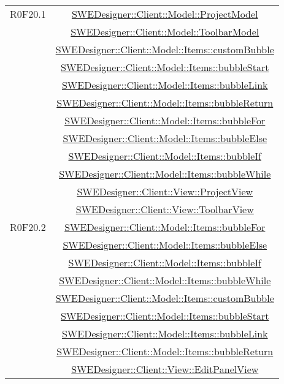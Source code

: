 \documentclass[../DefinizioneDiProdotto.tex]{subfiles}
\begin{document}
\begin{longtable}{|c|c|}
				R0F20.1
				& \hyperlink{SWEDesigner::Client::Model::ProjectModel}{SWEDesigner::Client::Model::ProjectModel}\\
				& \hyperlink{SWEDesigner::Client::Model::ToolbarModel}{SWEDesigner::Client::Model::ToolbarModel}\\
				& \hyperlink{SWEDesigner::Client::Model::Items::customBubble}{SWEDesigner::Client::Model::Items::customBubble}\\
				& \hyperlink{SWEDesigner::Client::Model::Items::bubbleStart}{SWEDesigner::Client::Model::Items::bubbleStart}\\
				& \hyperlink{SWEDesigner::Client::Model::Items::bubbleLink}{SWEDesigner::Client::Model::Items::bubbleLink}\\
				& \hyperlink{SWEDesigner::Client::Model::Items::bubbleReturn}{SWEDesigner::Client::Model::Items::bubbleReturn}\\
				& \hyperlink{SWEDesigner::Client::Model::Items::bubbleFor}{SWEDesigner::Client::Model::Items::bubbleFor}\\
				& \hyperlink{SWEDesigner::Client::Model::Items::bubbleElse}{SWEDesigner::Client::Model::Items::bubbleElse}\\
				& \hyperlink{SWEDesigner::Client::Model::Items::bubbleIf}{SWEDesigner::Client::Model::Items::bubbleIf}\\
				& \hyperlink{SWEDesigner::Client::Model::Items::bubbleWhile}{SWEDesigner::Client::Model::Items::bubbleWhile}\\
				& \hyperlink{SWEDesigner::Client::View::ProjectView}{SWEDesigner::Client::View::ProjectView}\\
				& \hyperlink{SWEDesigner::Client::View::ToolbarView}{SWEDesigner::Client::View::ToolbarView}\\
				\hline

				R0F20.2
				& \hyperlink{SWEDesigner::Client::Model::Items::bubbleFor}{SWEDesigner::Client::Model::Items::bubbleFor}\\
				& \hyperlink{SWEDesigner::Client::Model::Items::bubbleElse}{SWEDesigner::Client::Model::Items::bubbleElse}\\
				& \hyperlink{SWEDesigner::Client::Model::Items::bubbleIf}{SWEDesigner::Client::Model::Items::bubbleIf}\\
				& \hyperlink{SWEDesigner::Client::Model::Items::bubbleWhile}{SWEDesigner::Client::Model::Items::bubbleWhile}\\
				& \hyperlink{SWEDesigner::Client::Model::Items::customBubble}{SWEDesigner::Client::Model::Items::customBubble}\\
				& \hyperlink{SWEDesigner::Client::Model::Items::bubbleStart}{SWEDesigner::Client::Model::Items::bubbleStart}\\
				& \hyperlink{SWEDesigner::Client::Model::Items::bubbleLink}{SWEDesigner::Client::Model::Items::bubbleLink}\\
				& \hyperlink{SWEDesigner::Client::Model::Items::bubbleReturn}{SWEDesigner::Client::Model::Items::bubbleReturn}\\
				& \hyperlink{SWEDesigner::Client::View::EditPanelView}{SWEDesigner::Client::View::EditPanelView}\\
				\hline


\end{longtable}
\end{document}
